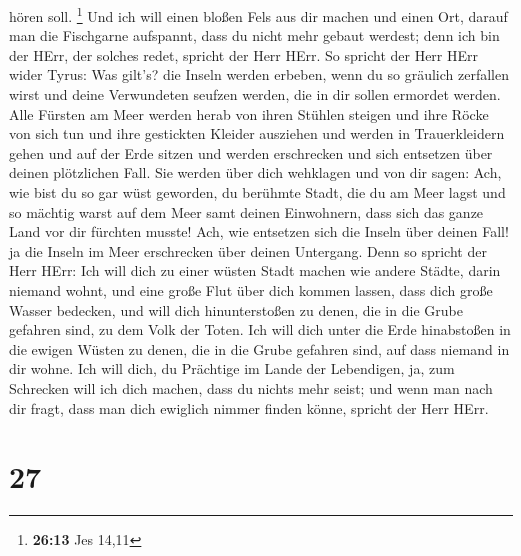 hören soll. \footnote{\textbf{26:13} Jes 14,11}  Und ich
will einen bloßen Fels aus dir machen und einen Ort, darauf man die
Fischgarne aufspannt, dass du nicht mehr gebaut werdest; denn ich bin
der HErr, der solches redet, spricht der Herr HErr.  So
spricht der Herr HErr wider Tyrus: Was gilt's? die Inseln werden
erbeben, wenn du so gräulich zerfallen wirst und deine Verwundeten
seufzen werden, die in dir sollen ermordet werden.  Alle
Fürsten am Meer werden herab von ihren Stühlen steigen und ihre Röcke
von sich tun und ihre gestickten Kleider ausziehen und werden in
Trauerkleidern gehen und auf der Erde sitzen und werden erschrecken und
sich entsetzen über deinen plötzlichen Fall.  Sie werden
über dich wehklagen und von dir sagen: Ach, wie bist du so gar wüst
geworden, du berühmte Stadt, die du am Meer lagst und so mächtig warst
auf dem Meer samt deinen Einwohnern, dass sich das ganze Land vor dir
fürchten musste!  Ach, wie entsetzen sich die Inseln über
deinen Fall! ja die Inseln im Meer erschrecken über deinen Untergang.
 Denn so spricht der Herr HErr: Ich will dich zu einer
wüsten Stadt machen wie andere Städte, darin niemand wohnt, und eine
große Flut über dich kommen lassen, dass dich große Wasser bedecken,
 und will dich hinunterstoßen zu denen, die in die Grube
gefahren sind, zu dem Volk der Toten. Ich will dich unter die Erde
hinabstoßen in die ewigen Wüsten zu denen, die in die Grube gefahren
sind, auf dass niemand in dir wohne. Ich will dich, du Prächtige im
Lande der Lebendigen,  ja, zum Schrecken will ich dich
machen, dass du nichts mehr seist; und wenn man nach dir fragt, dass man
dich ewiglich nimmer finden könne, spricht der Herr HErr.

\hypertarget{section-26}{%
\section{27}\label{section-26}}

